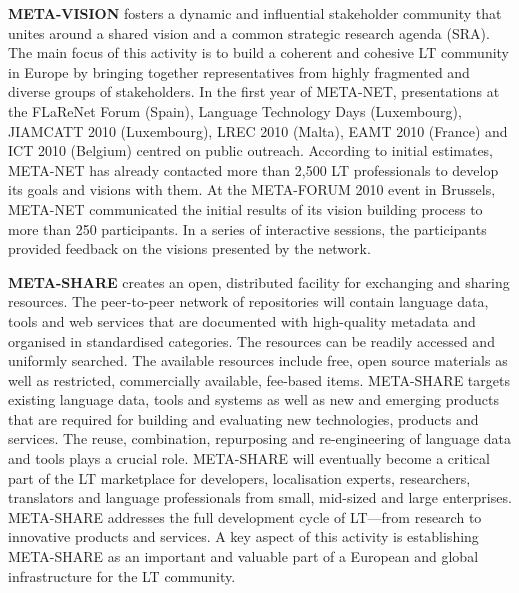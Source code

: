 \begin{multicols}{2}
\textbf{META-VISION} fosters a dynamic and influential stakeholder
community that unites around a shared vision and a common strategic
research agenda (SRA). The main focus of this activity is to build a
coherent and cohesive LT community in Europe by bringing together
representatives from highly fragmented and diverse groups of
stakeholders. In the first year of META-NET, presentations at the
FLaReNet Forum (Spain), Language Technology Days (Luxembourg),
JIAMCATT 2010 (Luxembourg), LREC 2010 (Malta), EAMT 2010 (France) and
ICT 2010 (Belgium) centred on public outreach. According to initial
estimates, META-NET has already contacted more than 2,500 LT
professionals to develop its goals and visions with them. At the
META-FORUM 2010 event in Brussels, META-NET communicated the initial
results of its vision building process to more than 250
participants. In a series of interactive sessions, the participants
provided feedback on the visions presented by the network.

\textbf{META-SHARE} creates an open, distributed facility for
exchanging and sharing resources. The peer-to-peer network of
repositories will contain language data, tools and web services that
are documented with high-quality metadata and organised in
standardised categories. The resources can be readily accessed and
uniformly searched. The available resources include free, open source
materials as well as restricted, commercially available, fee-based
items. META-SHARE targets existing language data, tools and systems as
well as new and emerging products that are required for building and
evaluating new technologies, products and services. The reuse,
combination, repurposing and re-engineering of language data and tools
plays a crucial role. META-SHARE will eventually become a critical
part of the LT marketplace for developers, localisation experts,
researchers, translators and language professionals from small,
mid-sized and large enterprises. META-SHARE addresses the full
development cycle of LT—from research to innovative products and
services. A key aspect of this activity is establishing META-SHARE as
an important and valuable part of a European and global infrastructure
for the LT community.


\end{multicols}
